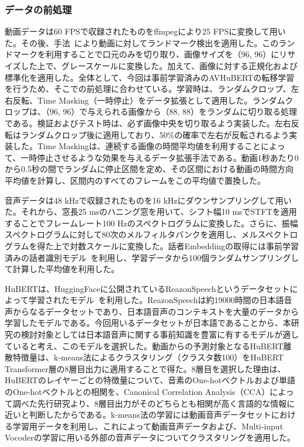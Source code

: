 \documentclass[12pt]{jarticle}
\numberwithin{equation}{section}    %
\numberwithin{figure}{section}      %
\numberwithin{table}{section}      %
\begin{document}
\subsubsection{データの前処理}
動画データは60 FPSで収録されたものをffmpegにより25 FPSに変換して用いた。その後、手法~\cite{bulat2017far}により動画に対してランドマーク検出を適用した。このランドマークを利用することで口元のみを切り取り、画像サイズを（96, 96）にリサイズした上で、グレースケールに変換した。加えて、画像に対する正規化および標準化を適用した。全体として、今回は事前学習済みのAVHuBERTの転移学習を行うため、そこでの前処理に合わせている。学習時は、ランダムクロップ、左右反転、Time Masking（一時停止）をデータ拡張として適用した。ランダムクロップは、（96, 96）で与えられる画像から（88, 88）をランダムに切り取る処理である。検証およびテスト時は、必ず画像中央を切り取るよう実装した。左右反転はランダムクロップ後に適用しており、50\%の確率で左右が反転されるよう実装した。Time Maskingは、連続する画像の時間平均値を利用することによって、一時停止させるような効果を与えるデータ拡張手法である。動画1秒あたり0から0.5秒の間でランダムに停止区間を定め、その区間における動画の時間方向平均値を計算し、区間内のすべてのフレームをこの平均値で置換した。

音声データは48 kHzで収録されたものを16 kHzにダウンサンプリングして用いた。それから、窓長25 msのハニング窓を用いて、シフト幅10 msでSTFTを適用することでフレームレート100 Hzのスペクトログラムに変換した。さらに、振幅スペクトログラムに対して80次のメルフィルタバンクを適用し、メルスペクトログラムを得た上で対数スケールに変換した。話者Embeddingの取得には事前学習済みの話者識別モデル~\cite{wan2018generalized}を利用し、学習データから100個ランダムサンプリングして計算した平均値を利用した。

HuBERTは、HuggingFaceに公開されているReazonSpeechというデータセットによって学習されたモデル~\cite{rinna-japanese-hubert-base,sawada2024release}を利用した。ReazonSpeechは約19000時間の日本語音声からなるデータセットであり、日本語音声のコンテキストを大量のデータから学習したモデルである。今回用いるデータセットが日本語であることから、本研究の検討対象としては日本語音声に関する事前知識を豊富に有するモデルが適していると考え、このモデルを選択した。動画からの予測対象となるHuBERT離散特徴量は、k-means法によるクラスタリング（クラスタ数100）をHuBERT Transformer層の8層目出力に適用することで得た。8層目を選択した理由は、HuBERTのレイヤーごとの特徴量について、音素のOne-hotベクトルおよび単語のOne-hotベクトルとの相関を、Canonical Correlation Analysis（CCA）によって調べた先行研究\cite{pasad2023comparative}より、8層目出力がそのどちらとも相関が高く言語的な情報に近いと判断したからである。k-means法の学習には動画音声データセットにおける学習用データを利用し、これによって動画音声データおよび、Multi-input Vocoderの学習に用いる外部の音声データについてクラスタリングを適用した。
\end{document}
